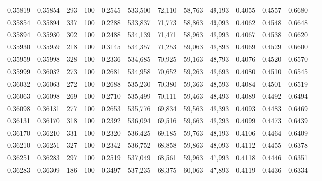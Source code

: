 \begin{tabular}{rrrrrrrrrrrrr}
0.35819 & 0.35854 &   293 & 100 &                                     0.2545 & 533,500 &  72,110 &  58,763 &  49,193 & 0.4055 & 0.4557 & 0.6680 \\
0.35854 & 0.35894 &   337 & 100 &                                     0.2288 & 533,837 &  71,773 &  58,863 &  49,093 & 0.4062 & 0.4548 & 0.6648 \\
0.35894 & 0.35930 &   302 & 100 &                                     0.2488 & 534,139 &  71,471 &  58,963 &  48,993 & 0.4067 & 0.4538 & 0.6620 \\
0.35930 & 0.35959 &   218 & 100 &                                     0.3145 & 534,357 &  71,253 &  59,063 &  48,893 & 0.4069 & 0.4529 & 0.6600 \\
0.35959 & 0.35998 &   328 & 100 &                                     0.2336 & 534,685 &  70,925 &  59,163 &  48,793 & 0.4076 & 0.4520 & 0.6570 \\
0.35999 & 0.36032 &   273 & 100 &                                     0.2681 & 534,958 &  70,652 &  59,263 &  48,693 & 0.4080 & 0.4510 & 0.6545 \\
0.36032 & 0.36063 &   272 & 100 &                                     0.2688 & 535,230 &  70,380 &  59,363 &  48,593 & 0.4084 & 0.4501 & 0.6519 \\
0.36063 & 0.36098 &   269 & 100 &                                     0.2710 & 535,499 &  70,111 &  59,463 &  48,493 & 0.4089 & 0.4492 & 0.6494 \\
0.36098 & 0.36131 &   277 & 100 &                                     0.2653 & 535,776 &  69,834 &  59,563 &  48,393 & 0.4093 & 0.4483 & 0.6469 \\
0.36131 & 0.36170 &   318 & 100 &                                     0.2392 & 536,094 &  69,516 &  59,663 &  48,293 & 0.4099 & 0.4473 & 0.6439 \\
0.36170 & 0.36210 &   331 & 100 &                                     0.2320 & 536,425 &  69,185 &  59,763 &  48,193 & 0.4106 & 0.4464 & 0.6409 \\
0.36210 & 0.36251 &   327 & 100 &                                     0.2342 & 536,752 &  68,858 &  59,863 &  48,093 & 0.4112 & 0.4455 & 0.6378 \\
0.36251 & 0.36283 &   297 & 100 &                                     0.2519 & 537,049 &  68,561 &  59,963 &  47,993 & 0.4118 & 0.4446 & 0.6351 \\
0.36283 & 0.36309 &   186 & 100 &                                     0.3497 & 537,235 &  68,375 &  60,063 &  47,893 & 0.4119 & 0.4436 & 0.6334 \\

\end{tabular}
